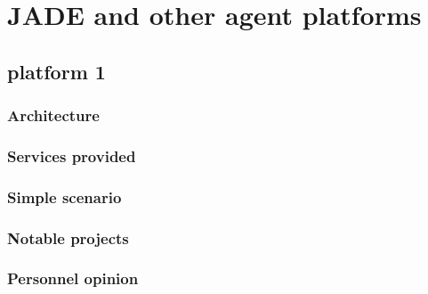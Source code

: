 \documentclass[a4paper,11pt]{report}
\begin{document}
  
  
  
  \section{JADE and other agent platforms} %
  
  
  \subsection{platform 1} %
  
  \subsubsection{Architecture}
  
  \subsubsection{Services provided}
  
  \subsubsection{Simple scenario}
  
  \subsubsection{Notable projects}
  
  \subsubsection{Personnel opinion}
  
\end{document}
